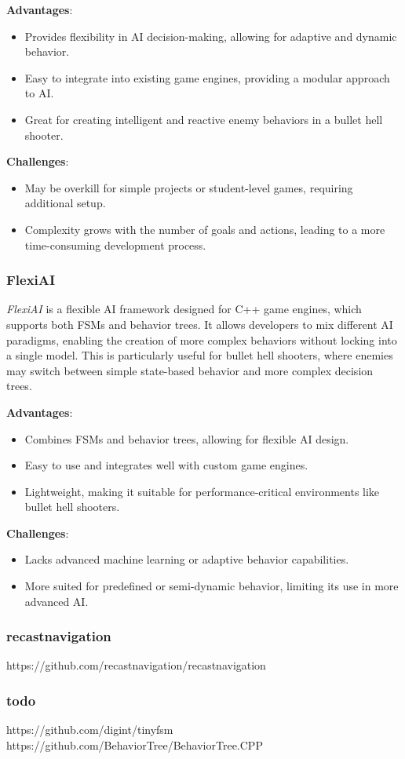 \textbf{Advantages}:
\begin{itemize}
    \item Provides flexibility in AI decision-making, allowing for adaptive and dynamic behavior.
    \item Easy to integrate into existing game engines, providing a modular approach to AI.
    \item Great for creating intelligent and reactive enemy behaviors in a bullet hell shooter.
\end{itemize}

\textbf{Challenges}:
\begin{itemize}
    \item May be overkill for simple projects or student-level games, requiring additional setup.
    \item Complexity grows with the number of goals and actions, leading to a more time-consuming development process.
\end{itemize}

\subsubsection{FlexiAI}

\textit{FlexiAI} is a flexible AI framework designed for C++ game engines, which supports both FSMs and behavior trees. It allows developers to mix different AI paradigms, enabling the creation of more complex behaviors without locking into a single model. This is particularly useful for bullet hell shooters, where enemies may switch between simple state-based behavior and more complex decision trees.

\textbf{Advantages}:
\begin{itemize}
    \item Combines FSMs and behavior trees, allowing for flexible AI design.
    \item Easy to use and integrates well with custom game engines.
    \item Lightweight, making it suitable for performance-critical environments like bullet hell shooters.
\end{itemize}

\textbf{Challenges}:
\begin{itemize}
    \item Lacks advanced machine learning or adaptive behavior capabilities.
    \item More suited for predefined or semi-dynamic behavior, limiting its use in more advanced AI.
\end{itemize}

\subsubsection{recastnavigation}
https://github.com/recastnavigation/recastnavigation

\subsubsection{todo}
https://github.com/digint/tinyfsm
https://github.com/BehaviorTree/BehaviorTree.CPP
